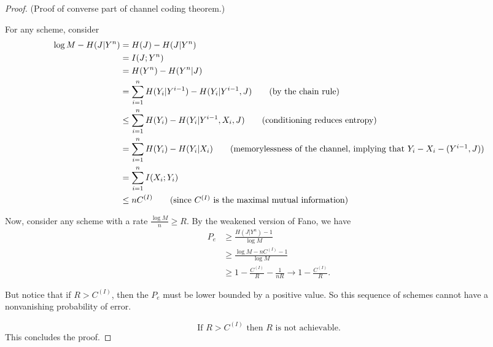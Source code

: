 \documentclass[12pt]{extarticle}
\newcommand{\bx}{\boxed}
\newcommand{\T}{\text}
\begin{document}
\begin{proof} (Proof of converse part of channel coding theorem.)

  For any scheme, consider
  \begin{align*}
    \log M - H(J | Y^n) &= H(J) - H(J | Y^n) \\
    &= I(J; Y^n) \\
    &= H(Y^n) - H(Y^n | J) \\
    &= \sum_{i=1}^{n} H(Y_i | Y^{i-1}) - H(Y_i | Y^{i-1}, J) \tag{by the chain rule}  \\
    & \leq \sum_{i=1}^{n} H(Y_i) - H(Y_i | Y^{i-1}, X_i, J) \tag{conditioning reduces entropy} \\
    &= \sum_{i=1}^{n} H(Y_i) - H(Y_i | X_i) \tag{memorylessness of the channel, implying that $Y_i - X_i - (Y^{i-1}, J)$}\\
    &= \sum_{i=1}^{n} I(X_i; Y_i) \\
    & \leq n C^{(I)} \tag{since $C^{(I)}$ is the maximal mutual information}
  \end{align*}

  Now, consider any scheme with a rate $\frac{\log M}{n}  \geq R$.  By the weakened version of Fano, we have
  \begin{align*}
    P_e &\geq \frac{H(J | Y^n) - 1}{\log M} \\
    & \geq \frac{\log M - n C^{(I)} - 1}{\log M} \\
    & \geq 1 - \frac{C^{(I)}}{R} - \frac{1}{nR} \to 1 - \frac{C^{(I)}}{R} \tag{as $n \to \infty$}.
  \end{align*}

  But notice that if $R > C^{(I)}$, then the $P_e$ must be lower bounded by a positive value.  So this sequence of schemes cannot have a nonvanishing probability of error.

  \[
    \bx{\T{If $R > C^{(I)}$ then $R$ is not achievable.}}
  \]
  This concludes the proof.
\end{proof}
\end{document}
